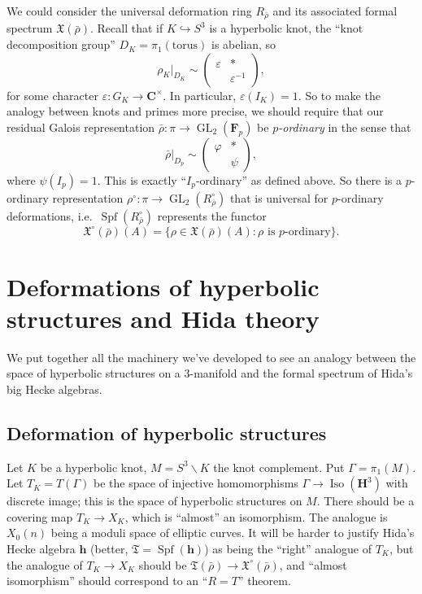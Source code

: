 \documentclass[oneside]{amsart}
\DeclareMathOperator{\formalspectrum}{Spf}
\DeclareMathOperator{\GL}{GL}
\DeclareMathOperator{\isometry}{Iso}
\newcommand{\dC}{\mathbf{C}}
\newcommand{\dF}{\mathbf{F}}
\newcommand{\dH}{\mathbf{H}}
\newcommand{\fT}{\mathfrak{T}}
\newcommand{\fX}{\mathfrak{X}}
\newcommand{\hida}{\mathbf{h}}
\begin{document}
We could consider the universal deformation ring $R_{\bar\rho}$ and its 
associated formal spectrum $\fX(\bar\rho)$. Recall that if 
$K\hookrightarrow S^3$ is a hyperbolic knot, the ``knot decomposition group'' 
$D_K=\pi_1(\mathrm{torus})$ is abelian, so 
\[
  \rho_K|_{D_K} \sim \begin{pmatrix} \varepsilon & \ast \\ & \varepsilon^{-1} \end{pmatrix} ,
\]
for some character $\varepsilon:G_K\to \dC^\times$. In particular, 
$\varepsilon(I_K)=1$. So to make the analogy between knots and primes more 
precise, we should require that our residual Galois representation 
$\bar\rho:\pi \to \GL_2(\dF_p)$ be \emph{$p$-ordinary} in the sense that 
\[
  \bar\rho|_{D_p} \sim \begin{pmatrix} \varphi & \ast \\ & \psi \end{pmatrix} ,
\]
where $\psi({I_p})=1$. This is exactly ``$I_p$-ordinary'' as defined above. So 
there is a $p$-ordinary representation 
$\rho^\circ:\pi \to \GL_2(R_{\bar\rho}^\circ)$ that is universal for 
$p$-ordinary deformations, 
i.e.~$\formalspectrum(R_{\bar\rho}^\circ)$ represents the 
functor
\[
  \fX^\circ(\bar\rho)(A) = \{\rho\in \fX(\bar\rho)(A):\rho\text{ is $p$-ordinary}\} .
\]





\section{Deformations of hyperbolic structures and Hida theory}

We put together all the machinery we've developed to see an analogy between the 
space of hyperbolic structures on a 3-manifold and the formal spectrum of 
Hida's big Hecke algebras. 


\subsection{Deformation of hyperbolic structures}

Let $K$ be a hyperbolic knot, $M=S^3\smallsetminus K$ the knot complement. Put 
$\Gamma=\pi_1(M)$. Let $T_K=T(\Gamma)$ be the space of injective 
homomorphisms $\Gamma\to \isometry(\dH^3)$ with discrete image; this is the 
space of hyperbolic structures on $M$. There should be a covering map 
$T_K \to X_K$, which is ``almost'' an isomorphism. The analogue is 
$X_0(n)$ being a moduli space of elliptic curves. It will be harder to justify 
Hida's Hecke algebra $\hida$ (better, $\fT=\formalspectrum(\hida)$) as 
being the ``right'' analogue of $T_K$, but the analogue of 
$T_K \to X_K$ should be $\fT(\bar\rho) \to \fX^\circ(\bar\rho)$, 
and ``almost isomorphism'' should correspond to an ``$R=T$'' theorem. 
\end{document}
